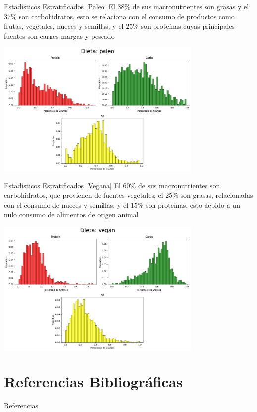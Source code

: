 \documentclass{beamer}
\begin{document}
    \begin{frame}{Estadísticos Estratificados [Paleo]}
        El $38\%$ de sus macronutrientes son grasas y el 
        $37\%$ son carbohidratos, esto se relaciona con 
        el consumo de productos como frutas, vegetales, 
        nueces y semillas; y el $25\%$ son proteínas cuyas 
        principales fuentes son carnes margas y pescado
        \begin{center}
            \includegraphics[width=0.75\textwidth]{Resources/2_03_plot_04.png}
        \end{center}
    \end{frame}

    \begin{frame}{Estadísticos Estratificados [Vegana]}
        El $60\%$ de sus macronutrientes son carbohidratos, 
        que provienen de fuentes vegetales; el $25\%$ son 
        grasas, relacionadas con el consumo de nueces y semillas; 
        y el $15\%$ son proteínas, esto debido a un nulo consumo 
        de alimentos de origen animal
        \begin{center}
            \includegraphics[width=0.75\textwidth]{Resources/2_03_plot_05.png}
        \end{center} 
    \end{frame}

    \section{Referencias Bibliográficas}

    \begin{frame}{Referencias}
        \printbibliography
    \end{frame}
\end{document}
